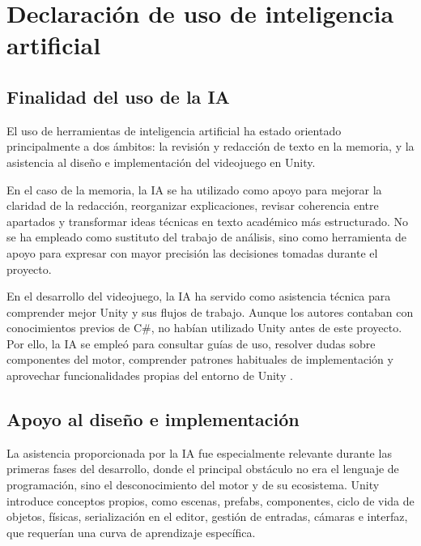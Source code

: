 \chapter{Declaración de uso de inteligencia artificial}

\begin{abstract}
En este anexo se declara el uso de herramientas de inteligencia artificial durante el
desarrollo de \textit{Via Inferni} y durante la elaboración de esta memoria. Su utilización
ha tenido un carácter asistencial y de apoyo, manteniendo siempre la revisión, validación y
responsabilidad final por parte de los autores del proyecto.
\end{abstract}

\section{Finalidad del uso de la IA}
El uso de herramientas de inteligencia artificial ha estado orientado principalmente a dos
ámbitos: la revisión y redacción de texto en la memoria, y la asistencia al diseño e
implementación del videojuego en Unity.

En el caso de la memoria, la IA se ha utilizado como apoyo para mejorar la claridad de la
redacción, reorganizar explicaciones, revisar coherencia entre apartados y transformar
ideas técnicas en texto académico más estructurado. No se ha empleado como sustituto del
trabajo de análisis, sino como herramienta de apoyo para expresar con mayor precisión las
decisiones tomadas durante el proyecto.

En el desarrollo del videojuego, la IA ha servido como asistencia técnica para comprender
mejor Unity y sus flujos de trabajo. Aunque los autores contaban con conocimientos previos
de C\#, no habían utilizado Unity antes de este proyecto. Por ello, la IA se empleó para
consultar guías de uso, resolver dudas sobre componentes del motor, comprender patrones
habituales de implementación y aprovechar funcionalidades propias del entorno de Unity \cite{unityLearnGettingStarted,unityScriptableObject}.

\section{Apoyo al diseño e implementación}
La asistencia proporcionada por la IA fue especialmente relevante durante las primeras fases
del desarrollo, donde el principal obstáculo no era el lenguaje de programación, sino el
desconocimiento del motor y de su ecosistema. Unity introduce conceptos propios, como
escenas, prefabs, componentes, ciclo de vida de objetos, físicas, serialización en el
editor, gestión de entradas, cámaras e interfaz, que requerían una curva de aprendizaje
específica.

